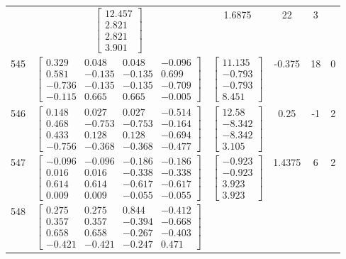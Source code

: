 \documentclass[a4paper,12pt]{article}
\begin{document}
\begin{tabular}{c c c c c c}
&
$\begin{bmatrix} 12.457 \\ 2.821 \\ 2.821 \\ 3.901 \end{bmatrix}$
&
1.6875
&
22
&
3
\\
545
&
$\begin{bmatrix} 0.329 & 0.048 & 0.048 & -0.096 \\ 0.581 & -0.135 & -0.135 & 0.699 \\ -0.736 & -0.135 & -0.135 & -0.709 \\ -0.115 & 0.665 & 0.665 & -0.005 \end{bmatrix}$
&
$\begin{bmatrix} 11.135 \\ -0.793 \\ -0.793 \\ 8.451 \end{bmatrix}$
&
-0.375
&
18
&
0
\\
546
&
$\begin{bmatrix} 0.148 & 0.027 & 0.027 & -0.514 \\ 0.468 & -0.753 & -0.753 & -0.164 \\ 0.433 & 0.128 & 0.128 & -0.694 \\ -0.756 & -0.368 & -0.368 & -0.477 \end{bmatrix}$
&
$\begin{bmatrix} 12.58 \\ -8.342 \\ -8.342 \\ 3.105 \end{bmatrix}$
&
0.25
&
-1
&
2
\\
547
&
$\begin{bmatrix} -0.096 & -0.096 & -0.186 & -0.186 \\ 0.016 & 0.016 & -0.338 & -0.338 \\ 0.614 & 0.614 & -0.617 & -0.617 \\ 0.009 & 0.009 & -0.055 & -0.055 \end{bmatrix}$
&
$\begin{bmatrix} -0.923 \\ -0.923 \\ 3.923 \\ 3.923 \end{bmatrix}$
&
1.4375
&
6
&
2
\\
548
&
$\begin{bmatrix} 0.275 & 0.275 & 0.844 & -0.412 \\ 0.357 & 0.357 & -0.394 & -0.668 \\ 0.658 & 0.658 & -0.267 & -0.403 \\ -0.421 & -0.421 & -0.247 & 0.471 \end{bmatrix}$

\end{tabular}
\end{document}
